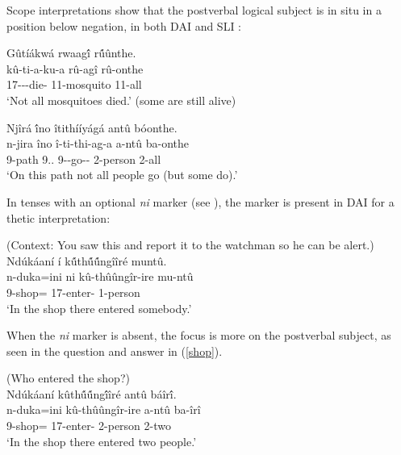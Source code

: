\documentclass[output=paper]{langscibook}
\begin{document}
Scope interpretations show that the postverbal logical subject is in situ in a position below negation, in both DAI  and SLI :

\ea
\label{bkm:Ref94171916}
Gûtíákwá rwaag\'{î} r\'{û}ûnthe.\\
\gll
kû-ti-a-ku-a   rû-agî  rû-onthe\\
17\SM-\NEG-\PST{}-die-\FV{} 11-mosquito  11-all\\
\glt
‘Not all mosquitoes died.’ (some are still alive)

\z

\ea
\label{bkm:Ref94171922}
{Njîrá \'{î}no îtithííyágá antû bóonthe.}\\
\gll
n-jira  îno  î-ti-thi-ag-a  a-ntû  ba-onthe\\
9-path  9.\DEM.\PROX{} 9\SM-\NEG{}-go-\HAB-\FV{} 2-person  2-all\\
\glt
‘On this path not all people go (but some do).’

\z


In tenses with an optional \textit{ni} marker (see ), the marker is present in DAI for a thetic interpretation:

\ea
(Context: You saw this and report it to the watchman so he can be alert.)\\
Ndúkáaní í k\'{û}th\'{û}\'{û}ngîîré muntû.\\
\gll
n-duka=ini  ni  kû-thûûngîr-ire  mu-ntû\\
9-shop=\LOC{}  \FOC{} 17\SM{}-enter-\PFV{} 1-person\\
\glt
‘In the shop there entered somebody.’

\z


When the \textit{ni} marker is absent, the focus is more on the postverbal subject, as seen in the question and answer in (\ref{shop}).

\ea
\label{shop}
(Who entered the shop?)\\
Ndúkáaní kûth\'{û}\'{û}ng\'{î}îré antû báîr\'{î}.\\
\gll
n-duka=ini  kû-thûûngîr-ire  a-ntû  ba-îrî\\
9-shop=\LOC{} 17\SM{}-enter-\PFV{} 2-person  2-two\\
\glt
‘In the shop there entered two people.’
\end{document}
